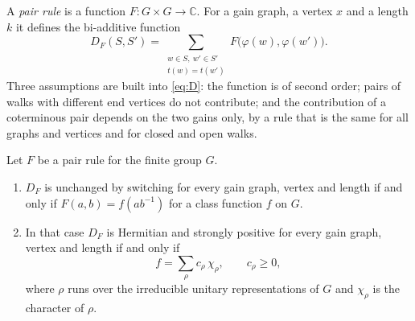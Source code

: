 A \emph{pair rule} is a function $F\colon G\times G\to\mathbb{C}$. For a gain graph, a vertex $x$ and a length $k$ it defines the bi-additive function
\begin{equation}\label{eq:D}
D_F(S,S')=\sum_{\substack{w\in S,\ w'\in S'\\ t(w)=t(w')}}F\bigl(\varphi(w),\varphi(w')\bigr).
\end{equation}
Three assumptions are built into \eqref{eq:D}: the function is of second order; pairs of walks with different end vertices do not contribute; and the contribution of a coterminous pair depends on the two gains only, by a rule that is the same for all graphs and vertices and for closed and open walks.

\begin{theorem}\label{thm:main}
Let $F$ be a pair rule for the finite group $G$.
\begin{enumerate}[label=(\alph*)]
\item $D_F$ is unchanged by switching for every gain graph, vertex and length if and only if $F(a,b)=f(ab^{-1})$ for a class function $f$ on $G$.
\item In that case $D_F$ is Hermitian and strongly positive for every gain graph, vertex and length if and only if
\begin{equation}\label{eq:pd}
f=\sum_\rho c_\rho\,\chi_\rho,\qquad c_\rho\ge0,
\end{equation}
where $\rho$ runs over the irreducible unitary representations of $G$ and $\chi_\rho$ is the character of $\rho$.
\end{enumerate}
\end{theorem}
